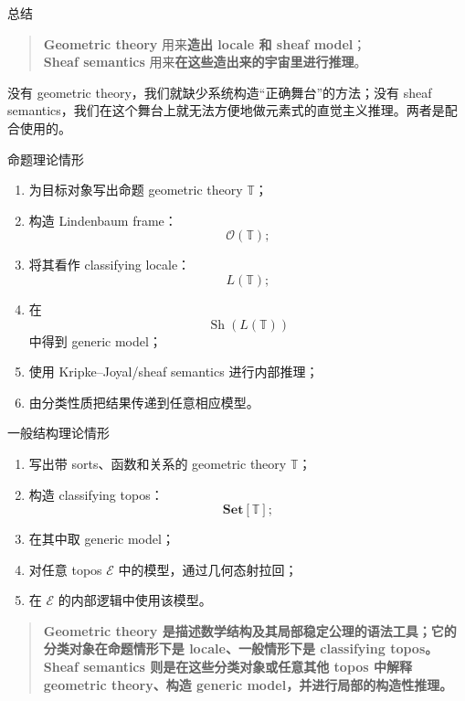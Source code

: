 \documentclass{beamer}
\begin{document}
\begin{frame}{总结}

\begin{quote}
\textbf{Geometric theory} 用来\textbf{造出 locale 和 sheaf model}；\\
\textbf{Sheaf semantics} 用来\textbf{在这些造出来的宇宙里进行推理}。
\end{quote}

没有 geometric theory，我们就缺少系统构造``正确舞台''的方法；没有 sheaf semantics，我们在这个舞台上就无法方便地做元素式的直觉主义推理。两者是配合使用的。
\end{frame}

\begin{frame}[shrink]
命题理论情形

\begin{enumerate}
\item 为目标对象写出命题 geometric theory \(\mathbb T\)；
\item 构造 Lindenbaum frame：
   \[
   \mathcal O(\mathbb T);
   \]
\item 将其看作 classifying locale：
   \[
   L(\mathbb T);
   \]
\item 在
   \[
   \operatorname{Sh}(L(\mathbb T))
   \]
   中得到 generic model；
\item 使用 Kripke--Joyal/sheaf semantics 进行内部推理；
\item 由分类性质把结果传递到任意相应模型。
\end{enumerate}

一般结构理论情形

\begin{enumerate}
\item 写出带 sorts、函数和关系的 geometric theory \(\mathbb T\)；
\item 构造 classifying topos：
   \[
   \mathbf{Set}[\mathbb T];
   \]
\item 在其中取 generic model；
\item 对任意 topos \(\mathcal E\) 中的模型，通过几何态射拉回；
\item 在 \(\mathcal E\) 的内部逻辑中使用该模型。
\end{enumerate}
\end{frame}

\begin{frame}
\begin{quote}
\textbf{Geometric theory 是描述数学结构及其局部稳定公理的语法工具；它的分类对象在命题情形下是 locale、一般情形下是 classifying topos。Sheaf semantics 则是在这些分类对象或任意其他 topos 中解释 geometric theory、构造 generic model，并进行局部的构造性推理。}
\end{quote}
\end{frame}
\end{document}

